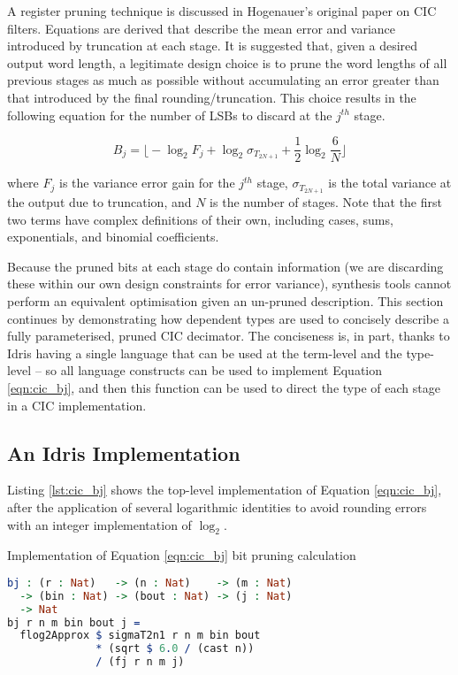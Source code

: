 \documentclass[conference]{IEEEtran}
\begin{document}
A register pruning technique is discussed in Hogenauer's original paper on CIC
filters\cite{hogenauer_81}. Equations are derived that describe the mean error
and variance introduced by truncation at each stage. It is suggested that, given
a desired output word length, a legitimate design choice is to prune the word
lengths of all previous stages as much as possible without accumulating an error
greater than that introduced by the final rounding/truncation. This choice
results in the following equation for the number of LSBs to discard at the
$j^{th}$ stage.

\begin{equation}
  B_j = {\Bigg \lfloor} -\log_2F_j + \log_2\sigma_{T_{2N+1}} +\frac{1}{2}\log_2\frac{6}{N} {\Bigg \rfloor}
  \label{eqn:cic_bj}
\end{equation}

where $F_j$ is the variance error gain for the $j^{th}$ stage,
$\sigma_{T_{2N+1}}$ is the total variance at the output due to truncation, and
$N$ is the number of stages. Note that the first two terms have complex
definitions of their own, including cases, sums, exponentials, and binomial
coefficients\cite{hogenauer_81}.

Because the pruned bits at each stage do contain information (we are discarding
these within our own design constraints for error variance), synthesis tools
cannot perform an equivalent optimisation given an un-pruned description. This
section continues by demonstrating how dependent types are used to concisely
describe a fully parameterised, pruned CIC decimator. The conciseness is, in
part, thanks to Idris having a single language that can be used at the
term-level and the type-level -- so all language constructs can be used to
implement Equation \ref{eqn:cic_bj}, and then this function can be used to
direct the type of each stage in a CIC implementation.

\subsection{An Idris Implementation}

Listing \ref{lst:cic_bj} shows the top-level implementation of Equation
\ref{eqn:cic_bj}, after the application of several logarithmic identities to
avoid rounding errors with an integer implementation of $\log_2$.

\begin{codefig}[h]
  \caption{Implementation of Equation \ref{eqn:cic_bj} bit pruning calculation}
\begin{lstlisting}[language=idris]
bj : (r : Nat)   -> (n : Nat)    -> (m : Nat)
  -> (bin : Nat) -> (bout : Nat) -> (j : Nat)
  -> Nat
bj r n m bin bout j =
  flog2Approx $ sigmaT2n1 r n m bin bout
              * (sqrt $ 6.0 / (cast n))
              / (fj r n m j)
\end{lstlisting}
\label{lst:cic_bj}
\end{codefig}
\end{document}
